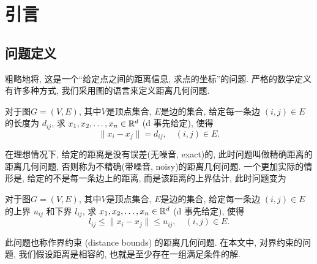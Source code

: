 \documentclass{CASthesis_zzk}
\begin{document}
\setcounter{page}{0}
  

  \tableofcontents
  \listoftables
  \listoffigures
%
%
\mainmatter

%  
%  
%  
%  
%  


\chapter{引言}
\label{cha:introduction}
\section{问题定义}
\label{sec:ProbDefinition}
粗略地将, 这是一个``给定点之间的距离信息, 求点的坐标''的问题.
严格的数学定义有许多种方式, 我们采用图的语言来定义距离几何问题. 

\begin{Prob}
对于图$G=(V,E)$, 其中$V$是顶点集合, $E$是边的集合, 
给定每一条边 $(i,j)\in E$ 的长度为 $d_{ij}$, 
求 $x_1,x_2,\ldots,x_n \in \mathbb{R}^d$ (d 事先给定), 使得
\begin{equation}
  \|x_i-x_j\|=d_{ij}, \quad (i,j)\in E.
\end{equation}
\end{Prob}

在理想情况下, 给定的距离是没有误差(无噪音, exact)的, 
此时问题叫做精确距离的距离几何问题, 否则称为不精确(带噪音, noisy)的距离几何问题.
一个更加实际的情形是, 给定的不是每一条边上的距离, 
而是该距离的上界估计, 此时问题变为

\begin{Prob}
对于图$G=(V,E)$, 其中$V$是顶点集合, $E$是边的集合, 
给定每一条边 $(i,j)\in E$ 的上界 $u_{ij}$ 和下界 $l_{ij}$, 
求 $x_1,x_2,\ldots,x_n \in \mathbb{R}^d$ (d 事先给定), 使得
\begin{equation}
  l_{ij}\leq \|x_i-x_j\| \leq u_{ij}, \quad (i,j)\in E.
\end{equation}
\end{Prob}

此问题也称作界约束 (distance bounds) 的距离几何问题.
在本文中, 对界约束的问题, 我们假设距离是相容的, 
也就是至少存在一组满足条件的解.
\end{document}
